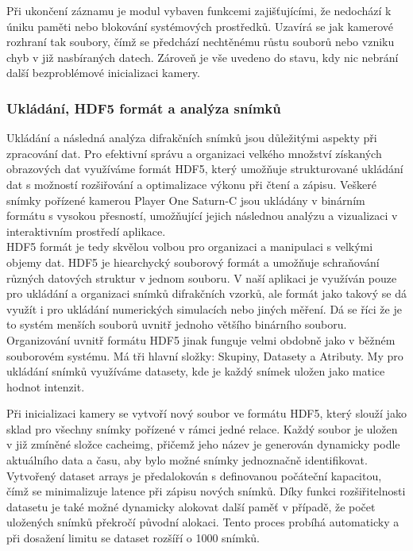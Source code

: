 \documentclass{article}
\begin{document}
Při ukončení záznamu je modul vybaven funkcemi zajišťujícími, že nedochází k úniku paměti nebo blokování systémových prostředků. Uzavírá se jak kamerové rozhraní tak soubory, čímž se předchází nechtěnému růstu souborů nebo vzniku chyb v již nasbíraných datech. Zároveň je vše uvedeno do stavu, kdy nic nebrání další bezproblémové inicializaci kamery.


\subsubsection{Ukládání, HDF5 formát a analýza snímků}
Ukládání a následná analýza difrakčních snímků jsou důležitými aspekty při zpracování dat. Pro efektivní správu a organizaci velkého množství získaných obrazových dat využíváme formát HDF5, který umožňuje strukturované ukládání dat s možností rozšiřování a optimalizace výkonu při čtení a zápisu. Veškeré snímky pořízené kamerou Player One Saturn-C jsou ukládány v binárním formátu s vysokou přesností, umožňující jejich následnou analýzu a vizualizaci v interaktivním prostředí aplikace.\\

HDF5 formát je tedy skvělou volbou pro organizaci a manipulaci s velkými objemy dat. HDF5 je hiearchycký souborový formát a umožňuje schraňování různých datových struktur v jednom souboru. V naší aplikaci je využíván pouze pro ukládání a organizaci snímků difrakčních vzorků, ale formát jako takový se dá využít i pro ukládání numerických simulacích nebo jiných měření. Dá se říci že je to systém menších souborů uvnitř jednoho většího binárního souboru. Organizování uvnitř formátu HDF5 jinak funguje velmi obdobně jako v běžném souborovém systému. Má tři hlavní složky: Skupiny, Datasety a Atributy. My pro ukládání snímků využíváme datasety, kde je každý snímek uložen jako matice hodnot intenzit.

Při inicializaci kamery se vytvoří nový soubor ve formátu HDF5, který slouží jako sklad pro všechny snímky pořízené v rámci jedné relace. Každý soubor je uložen v již zmíněné složce cacheimg, přičemž jeho název je generován dynamicky podle aktuálního data a času, aby bylo možné snímky jednoznačně identifikovat. Vytvořený dataset arrays je předalokován s definovanou počáteční kapacitou, čímž se minimalizuje latence při zápisu nových snímků. Díky funkci rozšiřitelnosti datasetu je také možné dynamicky alokovat další paměť v případě, že počet uložených snímků překročí původní alokaci. Tento proces probíhá automaticky a při dosažení limitu se dataset rozšíří o 1000 snímků.\\
\end{document}
